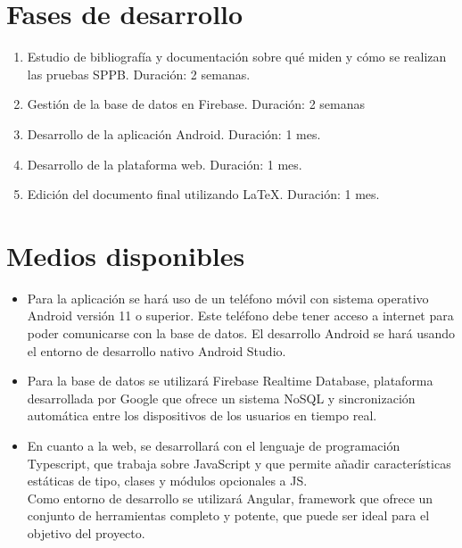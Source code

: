 \documentclass[12pt,oneside,a4paper]{article}
\begin{document}
\section{Fases de desarrollo}

\begin{enumerate}
\item Estudio de bibliografía y documentación sobre qué miden y cómo se realizan las pruebas SPPB.  Duración: 2 semanas.
\item Gestión de la base de datos en Firebase. Duración: 2 semanas
\item Desarrollo de la aplicación Android. Duración: 1 mes.
\item Desarrollo de la plataforma web. Duración: 1 mes.
\item Edición del documento final utilizando \LaTeX. Duración: 1 mes.
\end{enumerate}

\section{Medios disponibles}

\begin{itemize}
    \item Para la aplicación se hará uso de un teléfono móvil con sistema operativo Android versión 11 o superior. Este teléfono debe tener acceso a internet para poder comunicarse con la base de datos.
     El desarrollo Android se hará usando el entorno de desarrollo nativo Android Studio. \\
    \item Para la base de datos se utilizará Firebase Realtime Database, plataforma desarrollada por Google que ofrece un sistema NoSQL y sincronización automática entre los dispositivos de los usuarios en tiempo real. \\
    \item En cuanto a la web, se desarrollará con el lenguaje de programación Typescript, que trabaja sobre JavaScript y que permite añadir características estáticas de tipo, clases y módulos opcionales a JS. \\ 
    Como entorno de desarrollo se utilizará Angular, framework que ofrece un conjunto de herramientas completo y potente, que puede ser ideal para el objetivo del proyecto.
\end{itemize}








\end{document}
